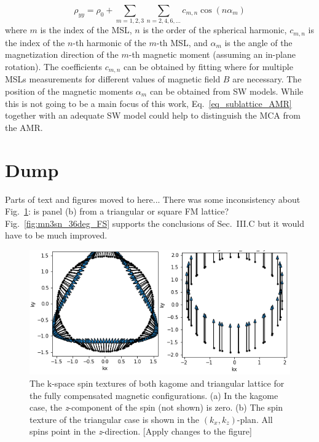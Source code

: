 \documentclass[prb,showpacs,amsmath,amssymb,superscriptaddress,twocolumn,floatfix]{revtex4-1}
\begin{document}
\begin{appendix}
\begin{equation}
	\rho_{yy} = \rho_0 + \sum_{m = 1,2,3} \sum_{n = 2, 4, 6, ...} c_{m,n} \cos(n \alpha_m)
	\label{eq_sublattice_AMR}
\end{equation}
where $m$ is the index of the MSL, $n$ is the order of the spherical harmonic, $c_{m,n}$ is the index of the $n$-th harmonic of the $m$-th MSL, and $\alpha_m$ is the angle of the magnetization direction of the $m$-th magnetic moment (assuming an in-plane rotation). The coefficients $c_{m,n}$ can be obtained by fitting where for multiple MSLs measurements for different values of magnetic field $B$ are necessary. The position of the magnetic moments $\alpha_m$ can be obtained from SW models. While this is not going to be a main focus of this work, Eq.~\ref{eq_sublattice_AMR} together with an adequate SW model could help to distinguish the MCA from the AMR.


\section{Dump}

Parts of text and figures moved to here... There was some
inconsistency about Fig.~\ref{fig:combinedspintexture}: is panel (b) from
a triangular or square FM lattice? Fig.~\ref{fig:mn3sn_36deg_FS} supports
the conclusions of Sec.~III.C but it would have to be much improved.


\begin{figure}
	\centering
	\includegraphics[width=1\linewidth]{img/Combined_Spintexture}
	\caption{The k-space spin textures of both kagome and triangular lattice for the fully compensated magnetic configurations. (a) In the kagome case, the \textit{z}-component of the spin (not shown) is zero. (b) The spin texture of the triangular case is shown in the $(k_x, k_z)$-plan. All spins point in the \textit{z}-direction. {\color{red}[Apply changes to the figure]}}
	\label{fig:combinedspintexture}
\end{figure}


\end{appendix}
\end{document}
